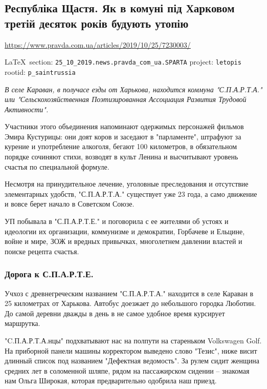 
 
\subsection{Республіка Щастя. Як в комуні під Харковом третій десяток років будують утопію}
\url{https://www.pravda.com.ua/articles/2019/10/25/7230003/}
  
\vspace{0.5cm}
 {\ifDEBUG\small\LaTeX~section: \verb|25_10_2019.news.pravda_com_ua.SPARTA| project: \verb|letopis| rootid: \verb|p_saintrussia| \fi}
\vspace{0.5cm}

{\em
В селе Караван, в получасе езды от Харькова, находится коммуна "С.П.А.Р.Т.А."
или "Сельскохозяйственная Поэтизированная Ассоциация Развития Трудовой
Активности". 

Участники этого объединения напоминают одержимых персонажей фильмов Эмира
Кустурицы: они доят коров и заседают в "парламенте", штрафуют за курение и
употребление алкоголя, бегают 100 километров, в обязательном порядке сочиняют
стихи, возводят в культ Ленина и высчитывают уровень счастья по специальной
формуле. 

Несмотря на принудительное лечение, уголовные преследования и отсутствие
элементарных удобств, "С.П.А.Р.Т.А." существует уже 23 года, а само движение и
вовсе берет начало в Советском Союзе.

УП побывала в "С.П.А.Р.Т.Е." и поговорила с ее жителями об устоях и идеологии
их организации, коммунизме и демократии, Горбачеве и Ельцине, войне и мире, ЗОЖ
и вредных привычках, многолетнем давлении властей и поиске рецепта счастья.
}

\subsubsection{Дорога к С.П.А.Р.Т.Е.}

Учхоз с древнегреческим названием "С.П.А.Р.Т.А." находится в селе Караван в 25
километрах от Харькова. Автобус доезжает до небольшого городка Люботин. До
самой деревни дважды в день в не самое удобное время курсирует маршрутка.

"C.П.А.Р.Т.А.нцы" подхватывают нас на полпути на стареньком Volkswagen Golf. На
приборной панели машины корректором выведено слово "Тезис", ниже висит длинный
список под названием "Дефектная ведомость". За рулем сидит женщина средних лет
в соломенной шляпе, рядом на пассажирском сидении – знакомая нам Ольга Широкая,
которая предварительно одобрила наш приезд.

